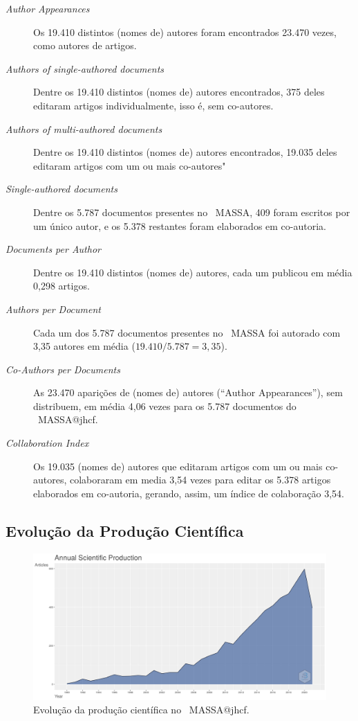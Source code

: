 \begin{description}
    \item [\textit{Author Appearances}] Os 19.410 distintos (nomes de) autores foram encontrados 23.470 vezes, como autores de artigos.
    \item [\textit{Authors of single-authored documents}] Dentre os 19.410 distintos (nomes de) autores encontrados, 375 deles editaram artigos individualmente, isso é, sem co-autores.
    \item [\textit{Authors of multi-authored documents}] Dentre os 19.410 distintos (nomes de) autores encontrados, 19.035 deles editaram artigos com um ou mais co-autores"
    \item [\textit{Single-authored documents}] Dentre os 5.787 documentos presentes no \dataset\   MASSA, 409 foram escritos por um único autor, e os 5.378 restantes foram elaborados em co-autoria.
    \item [\textit{Documents per Author}] Dentre os 19.410 distintos (nomes de) autores, cada um publicou em média 0,298 artigos.
    \item [\textit{Authors per Document}] Cada um dos 5.787 documentos presentes no \dataset\   MASSA foi autorado com 3,35 autores em média ($19.410 / 5.787 = 3,35$).
    \item [\textit{Co-Authors per Documents}] As 23.470 aparições de (nomes de) autores (``Author Appearances''), sem distribuem, em média 4,06 vezes para os 5.787 documentos do \dataset\   MASSA@jhcf.
    \item [\textit{Collaboration Index}] Os 19.035 (nomes de) autores que editaram artigos com um ou mais co-autores, colaboraram em media 3,54 vezes para editar os 5.378 artigos elaborados em co-autoria, gerando, assim, um índice de colaboração 3,54. 
\end{description}

\subsection{Evolução da Produção Científica}

\begin{figure}
    \centering
    \includegraphics[width=1\textwidth]{experiments/jhcf/PesqBibliogr/SimulacaoMultiagente/WoS-20210803/classico-mais-citacoes/Dataset/AnnualScientificProduction-2021-08-05.png}
    \caption{Evolução da produção científica no \dataset\   MASSA@jhcf.}
    \label{fig:evol:anual:MASSA@jhcf}
\end{figure}

